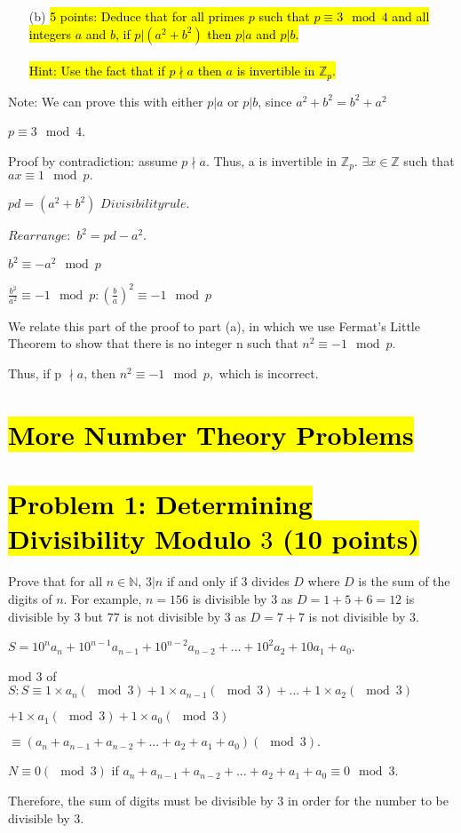 \documentclass[12pt]{article}
\begin{document}
\begin{enumerate}
\item[(b)] \hl{5 points: Deduce that for all primes $p$ such that $p \equiv 3 \mod 4$ 
and all integers $a$ and $b$, if $p | (a^2 + b^2)$ then $p | a$ and $p | b$.\\
\\
Hint: Use the fact that if $p \nmid a$ then $a$ is invertible in $\mathbb{Z}_p$.}
\end{enumerate}
\item Note: We can prove this with either $p|a$ or $p|b$, since $a^2+b^2 = b^2+a^2$
\item $p \equiv 3 \mod 4$. 
\item Proof by contradiction: assume $p \nmid a.$ Thus, a is invertible in $\mathbb{Z}_{p}.$ $\exists x \in \mathbb{Z}$ such that $ax \equiv 1 \mod p.$
\item $pd = (a^2+b^2)$ \rightarrow $ Divisibility rule.$\\
\item $Rearrange: $ $b^2 = pd-a^2$.
\item $b^2 \equiv -a^2 \mod p$
\item $\frac{b^{2}}{a^{2}} \equiv -1 \mod p: (\frac{b}{a})^2 \equiv -1 \mod p$
\item We relate this part of the proof to part (a), in which we use Fermat's Little Theorem to show that there is no integer n such that $n^2 \equiv -1 \mod p.$ 
\item Thus, if p $\nmid a$, then $n^2 \equiv -1 \mod p,$ which is incorrect.

\section{\hl{More Number Theory Problems}}
\section*{\hl{Problem 1: Determining Divisibility Modulo $3$ (10 points)}}
Prove that for all $n \in \mathbb{N}$, $3 | n$ if and only if $3$ divides $D$ where
$D$ is the sum of the digits of $n$. For example, $n = 156$ is divisible by $3$ as 
$D = 1 + 5 + 6 = 12$ is divisible by $3$ but $77$ is not divisible by $3$ as $D = 7
+ 7$ is not divisible by $3$.

\item $S = 10^{n}a_{n}+10^{n-1}a_{n-1}+10^{n-2}a_{n-2}+...+10^{2}a_{2}+10a_1+a_0$.
\item 
mod $3$ of $S: S \equiv 1 \times a_{n}(\mod 3) + 1 \times a_{n-1}(\mod 3) + ... + 1 \times a_{2} (\mod 3) $
\item $+ 1 \times a_{1} (\mod 3) + 1 \times a_{0} (\mod 3)$
\item $\equiv (a_n + a_{n-1} + a_{n-2} + ... + a_2 + a_1 + a_0) (\mod 3).$
\item $N \equiv 0 (\mod 3)$ if $a_n + a_{n-1} + a_{n-2} + ... + a_2 + a_1 + a_0 \equiv 0 \mod 3$.
\item Therefore, the sum of digits must be divisible by 3 in order for the number to be divisible by 3.
\end{document}
